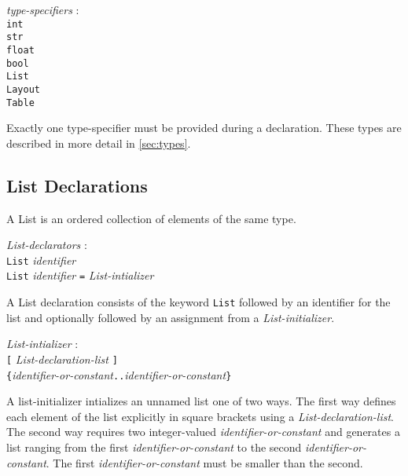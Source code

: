 \documentclass{article}
\begin{document}
\begin{tabbing}
	\= \emph{type}\=\emph{-specifiers} : \\
		\>\> \texttt{int} \\
		\>\> \texttt{str} \\
		\>\> \texttt{float} \\
		\>\> \texttt{bool} \\
		\>\> \texttt{List} \\
		\>\> \texttt{Layout} \\
		\>\> \texttt{Table} \\
\end{tabbing}

Exactly one type-specifier must be provided during a declaration. These types are described in more detail in \ref{sec:types}.

\subsection{List Declarations}
\label{sec:list}
A List is an ordered collection of elements of the same type. 
\begin{tabbing}
	\= \emph{List}\=\emph{-declarators} : \\
		\> \> \texttt{List} \emph{identifier} \\
		\>\> \texttt{List} \emph{identifier} \texttt{=} \emph{List-intializer } \texttt{} 
\end{tabbing}
A List declaration consists of the keyword \texttt{List} followed by an identifier for the list and optionally followed by an assignment from a \emph{List-initializer}.

\begin{tabbing}
	\= \emph{List}\=\emph{-intializer} : \\
		\> \> \texttt{[} \emph{List-declaration-list} \texttt{]} \\
		\>\> \texttt{\{}\emph{identifier-or-constant}\texttt{..}\emph{identifier-or-constant}\texttt{\}}
\end{tabbing}

A list-initializer intializes an unnamed list one of two ways. The first way defines each element of the list explicitly in square brackets using a \emph{List-declaration-list}. The second way requires two integer-valued \emph{identifier-or-constant} and generates a list ranging from the first \emph{identifier-or-constant} to the second \emph{identifier-or-constant}. The first \emph{identifier-or-constant} must be smaller than the second.
\end{document}
